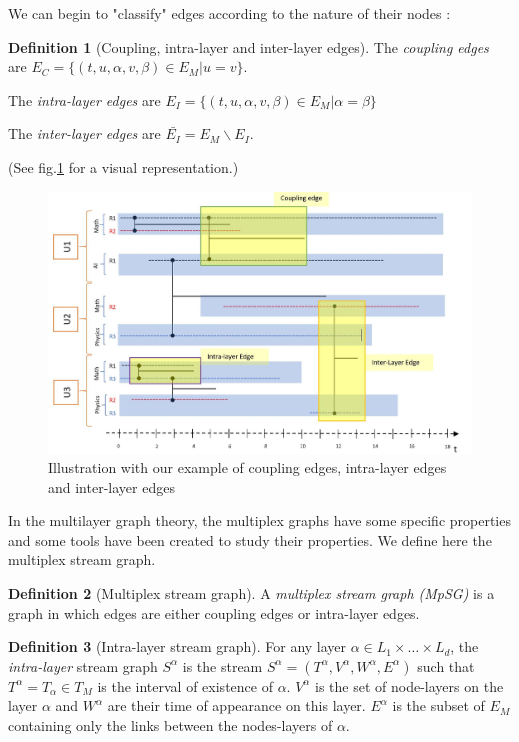\documentclass[dvipsnames,a4paper,11pt]{article}
\theoremstyle{definition}
\newtheorem{defn}{Definition}
\theoremstyle{remark}
\theoremstyle{remark}
\begin{document}
	We can begin to "classify" edges according to the nature of their nodes : 
	
	\begin{defn}[Coupling, intra-layer and inter-layer edges]

   	The {\em coupling edges} are $E_C=\{(t,u,\alpha,v,\beta)\in E_M | u=v\}$.

    The {\em intra-layer edges} are $E_I = \{(t,u,\alpha,v,\beta) \in E_M | \alpha = \beta \}$

    The {\em inter-layer edges} are $\bar{E_I} = E_M\backslash E_I$.
    
	(See fig.\ref{exIntraInter} for a visual representation.)
	
	\end{defn}	
	
	\begin{figure}[h]
		\centering
		\includegraphics[width=\textwidth]{schemas/edgesCat.jpg}
		\caption{Illustration with our example of coupling edges, intra-layer edges and inter-layer edges}
		\label{exIntraInter}
	\end{figure}
	
	In the multilayer graph theory, the multiplex graphs have some specific properties and some tools have been created to study their properties. We define here the multiplex stream graph.
	
	\begin{defn}[Multiplex stream graph]	
	A {\em multiplex stream graph (MpSG)} is a graph in which edges are either coupling edges or intra-layer edges.
	\end{defn}
	
	
	 
	\begin{defn}[Intra-layer stream graph]
	For any layer $\alpha \in L_1 \times \dots \times L_d$, the {\em intra-layer} stream graph $S^{\alpha}$ is the stream $S^{\alpha}=(T^{\alpha},V^{\alpha},W^{\alpha},E^{\alpha})$ such that $T^{\alpha} = T_{\alpha} \in T_M$ is the interval of existence of $\alpha$. $V^{\alpha}$ is the set of node-layers on the layer $\alpha$ and $W^{\alpha}$ are their time of appearance on this layer. $E^{\alpha}$ is the subset of $E_M$ containing only the links between the nodes-layers of $\alpha$.
	\end{defn}
	
\end{document}
